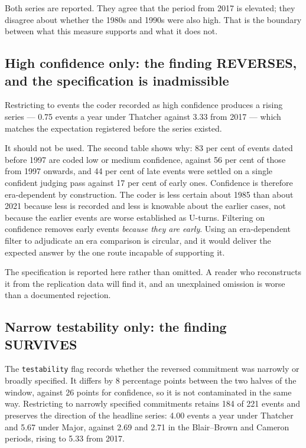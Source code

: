Both series are reported. They agree that the period from 2017 is elevated; they disagree about
whether the 1980s and 1990s were also high. That is the boundary between what this measure supports
and what it does not.

\subsection*{High confidence only: the finding REVERSES, and the specification is inadmissible}

Restricting to events the coder recorded as high confidence produces a rising series --- 0.75 events
a year under Thatcher against 3.33 from 2017 --- which matches the expectation registered before the
series existed.

It should not be used. The second table shows why: 83 per cent of events dated before 1997 are coded
low or medium confidence, against 56 per cent of those from 1997 onwards, and 44 per cent of late
events were settled on a single confident judging pass against 17 per cent of early ones. Confidence
is therefore era-dependent by construction. The coder is less certain about 1985 than about 2021
because less is recorded and less is knowable about the earlier cases, not because the earlier events
are worse established as U-turns. Filtering on confidence removes early events \emph{because they are
early}. Using an era-dependent filter to adjudicate an era comparison is circular, and it would
deliver the expected answer by the one route incapable of supporting it.

The specification is reported here rather than omitted. A reader who reconstructs it from the
replication data will find it, and an unexplained omission is worse than a documented rejection.

\subsection*{Narrow testability only: the finding SURVIVES}

The \texttt{testability} flag records whether the reversed commitment was narrowly or broadly
specified. It differs by 8 percentage points between the two halves of the window, against 26 points
for confidence, so it is not contaminated in the same way. Restricting to narrowly specified
commitments retains 184 of 221 events and preserves the direction of the headline series: 4.00 events
a year under Thatcher and 5.67 under Major, against 2.69 and 2.71 in the Blair--Brown and Cameron
periods, rising to 5.33 from 2017.

